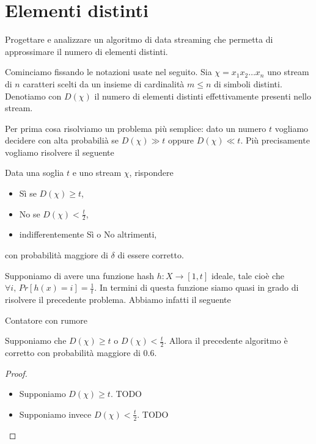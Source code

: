 \chapter{Elementi distinti}

\begin{problem*}
    Progettare e analizzare un algoritmo di data streaming che permetta di
    approssimare il numero di elementi distinti.
\end{problem*}

Cominciamo fissando le notazioni usate nel seguito. Sia \(\chi = x_1 x_2
\dots x_n\) uno stream di \(n\) caratteri scelti da un insieme di cardinalit\`a
\(m\le n\) di simboli distinti. Denotiamo con \(D(\chi)\) il numero di elementi
distinti effettivamente presenti nello stream.

Per prima cosa risolviamo un problema pi\`u semplice: dato un numero \(t\)
vogliamo decidere con alta probabili\`a se \(D(\chi) \gg t\) oppure \(D(\chi) \ll
t\). Pi\`u precisamente vogliamo risolvere il seguente
\begin{problem*}
  Data una soglia \(t\) e uno stream \(\chi\), rispondere
  \begin{itemize}
    \item S\`i se \(D(\chi)\ge t\),
    \item No se \(D(\chi)<\frac{t}{2}\),
    \item indifferentemente S\`i o No altrimenti,
  \end{itemize}
  con probabilit\`a maggiore di \(\delta\) di essere corretto.
\end{problem*}

Supponiamo di avere una funzione hash \(h:X\rightarrow [1,t]\) ideale, tale
cio\`e che \(\forall i\mbox{, }Pr[h(x) = i] = \frac{1}{t}\). In termini di
questa funzione siamo quasi in grado di risolvere il precedente problema.
Abbiamo infatti il seguente
\begin{algorithm}
  \caption{Contatore con rumore}
  \begin{algorithmic}[1]
        \State {}
      \EndIf
    \EndFor
    \State {}
  \end{algorithmic}
\end{algorithm}

\begin{lemma}
  Supponiamo che \(D(\chi)\ge t\) o \(D(\chi)<\frac{t}{2}\). Allora il precedente
  algoritmo \`e corretto con probabilit\`a maggiore di \(0.6\).
\end{lemma}
\begin{proof}
  \begin{itemize}
    \item Supponiamo \(D(\chi)\ge t\). TODO
    \item Supponiamo invece \(D(\chi)<\frac{t}{2}\). TODO
  \end{itemize}
\end{proof}

